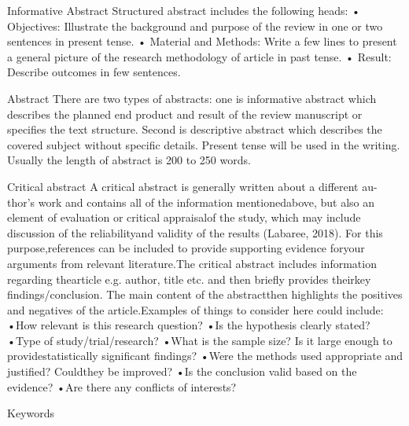 Informative Abstract
Structured abstract includes the following heads: 
• Objectives: Illustrate the background and purpose of the review in one or two sentences in present tense.
• Material and Methods: Write a few lines to present a general picture of the research methodology of article in past tense.
• Result: Describe outcomes in few sentences. 

Abstract
There are two types of abstracts: one is informative abstract which describes the planned end product and result of the review manuscript or specifies the text structure. Second is descriptive abstract which describes the covered subject without specific details. Present tense will be used in the writing. Usually the length of abstract is 200 to 250 words.


Critical abstract
A critical abstract is generally written about a different au-thor’s work and contains all of the information mentionedabove, but also an element of evaluation or critical appraisalof the study, which may include discussion of the reliabilityand validity of the results (Labaree, 2018). For this purpose,references can be included to provide supporting evidence foryour arguments from relevant literature.The critical abstract includes information regarding thearticle e.g. author, title etc. and then briefly provides theirkey findings/conclusion. The main content of the abstractthen highlights the positives and negatives of the article.Examples of things to consider here could include:
•How relevant is this research question?
•Is the hypothesis clearly stated?
•Type of study/trial/research?
•What is the sample size? Is it large enough to providestatistically significant findings?
•Were the methods used appropriate and justified? Couldthey be improved?
•Is the conclusion valid based on the evidence?
•Are there any conflicts of interests?

Keywords

